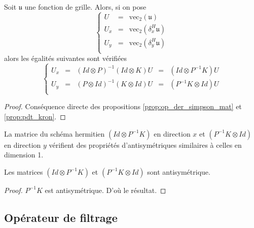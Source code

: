 \begin{theoreme}
Soit $\mathfrak{u}$ une fonction de grille. Alors, si on pose 
\begin{equation}
\left\lbrace
\begin{array}{rcl}
U & = & \text{vec}_2 (\mathfrak{u}) \\
U_x & = & \text{vec}_2 (\delta_x^H \mathfrak{u}) \\
U_y & = & \text{vec}_2 (\delta_y^H \mathfrak{u}) \\
\end{array}
\right.
\end{equation}
alors les égalités suivantes sont vérifiées
\begin{equation}
\left\lbrace
\begin{array}{rcccl}
U_x &=& (Id \otimes P)^{-1}(Id \otimes K) U &=& (Id \otimes P^{-1}K)U \\
U_y &=& (P \otimes Id)^{-1}(K \otimes Id) U &=& (P^{-1}K \otimes Id)U\\
\end{array}
\right.
\end{equation}
\end{theoreme}

\begin{proof}
Conséquence directe des propositions \ref{prop:op_der_simpson_mat} et \ref{prop:pdt_kron}.
\end{proof}

La matrice du schéma hermitien $(Id \otimes P^{-1}K)$ en direction $x$ et $(P^{-1}K \otimes Id)$ en direction $y$ vérifient des propriétés d'antisymétriques similaires à celles en dimension 1.
\begin{proposition}
Les matrices $(Id \otimes P^{-1}K)$ et $(P^{-1}K \otimes Id)$ sont antisymétrique.
\end{proposition}

\begin{proof}
$P^{-1}K$ est antisymétrique. D'où le résultat.
\end{proof}





















\subsection{Opérateur de filtrage}

